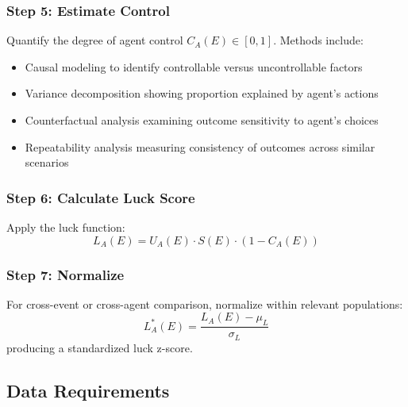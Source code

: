   \subsubsection{Step 5: Estimate Control}

  Quantify the degree of agent control $C_{A}(E) \in [0,1]$. Methods
  include:
  \begin{itemize}
    \item Causal modeling to identify controllable versus uncontrollable
      factors

    \item Variance decomposition showing proportion explained by agent's
      actions

    \item Counterfactual analysis examining outcome sensitivity to agent's
      choices

    \item Repeatability analysis measuring consistency of outcomes across
      similar scenarios
  \end{itemize}

  \subsubsection{Step 6: Calculate Luck Score}

  Apply the luck function:
  \begin{equation}
    L_{A}(E) = U_{A}(E) \cdot S(E) \cdot (1 - C_{A}(E))
  \end{equation}

  \subsubsection{Step 7: Normalize}

  For cross-event or cross-agent comparison, normalize within relevant populations:
  \begin{equation}
    L_{A}^{*}(E) = \frac{L_{A}(E) - \mu_{L}}{\sigma_{L}}
  \end{equation}
  producing a standardized luck z-score.

  \subsection{Data Requirements}

